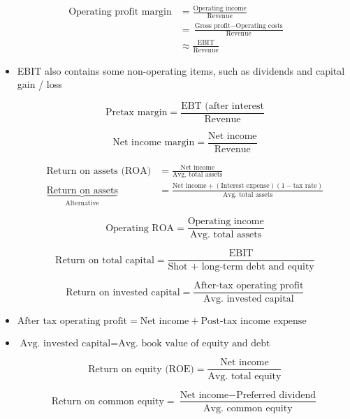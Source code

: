 \documentclass[../notes_compiled.tex]{subfiles}
\begin{document}
\begin{align*}
\text{Operating profit margin} &= \frac{\text{Operating income}}{\text{Revenue}} \\
&=\frac{\text{Gross profit}-\text{Operating costs}}{\text{Revenue}} \\
&\approx \frac{\text{EBIT}}{\text{Revenue}}
\end{align*}
\begin{itemize}
\item EBIT also contains some non-operating items, such as dividends and capital gain / loss

\begin{equation*}
\text{Pretax margin} = \frac{\text{EBT (after interest}}{\text{Revenue}}
\end{equation*}

\begin{equation*}
\text{Net income margin} = \frac{\text{Net income}}{\text{Revenue}}
\end{equation*}

\begin{align*}
\text{Return on assets (ROA)} &= \frac{\text{Net income}}{\text{Avg. total assets}} \\
\underbrace{\text{Return on assets}}_{\text{Alternative}}&=\frac{\text{Net income} + (\text{Interest expense})(1-\text{tax rate})}{\text{Avg. total assets}}
\end{align*}

\begin{equation*}
\text{Operating ROA} = \frac{\text{Operating income}}{\text{Avg. total assets}}
\end{equation*}

\begin{equation*}
\text{Return on total capital} = \frac{\text{EBIT}}{\text{Shot + long-term debt and equity}}
\end{equation*}

\begin{equation*}
\text{Return on invested capital} = \frac{\text{After-tax operating profit}}{\text{Avg. invested capital}}
\end{equation*}
\item $\text{After tax operating profit} = \text{Net income} + \text{Post-tax income expense}$
\item $\text{Avg. invested capital} = \text{Avg. book value of equity and debt}$

\begin{equation*}
\text{Return on equity (ROE)} = \frac{\text{Net income}}{\text{Avg. total equity}}
\end{equation*}

\begin{equation*}
\text{Return on common equity} = \frac{\text{Net income} - \text{Preferred dividend}}{\text{Avg. common equity}}
\end{equation*}

\end{itemize}
\end{document}
